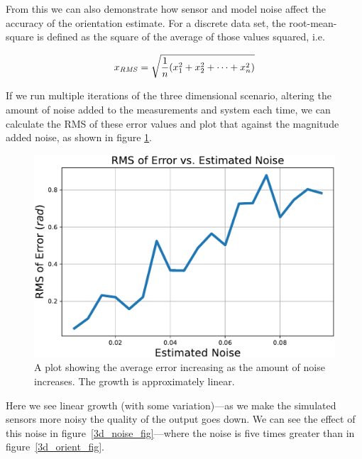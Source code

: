\documentclass[12pt]{article}
\begin{document}
From this we can also demonstrate how sensor and model noise affect the accuracy of the orientation estimate. For a discrete data set, the root-mean-square is defined as the square of the average of those values squared, i.e.

\newcommand{\RMS}{\ensuremath{\mathit{RMS}}} %
\begin{equation}
	x_\RMS = \sqrt{{1 \over n}(x_1^2 + x_2^2 + \dots + x_n^2)}
\end{equation}

If we run multiple iterations of the three dimensional scenario, altering the amount of noise added to the measurements and system each time, we can calculate the RMS of these error values and plot that against the magnitude added noise, as shown in figure \ref{3d_rms_fig}.

\begin{figure}[tp]
	\centering
	
	\includegraphics[width=\textwidth]{3d-rms.pdf}
	
	\caption{A plot showing the average error increasing as the amount of noise increases. The growth is approximately linear.}
	
	\label{3d_rms_fig}
\end{figure}

Here we see linear growth (with some variation)---as we make the simulated sensors more noisy the quality of the output goes down. We can see the effect of this noise in figure~\ref{3d_noise_fig}---where the noise is five times greater than in figure~\ref{3d_orient_fig}.
\end{document}
